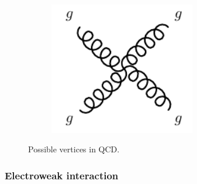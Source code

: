 \begin{figure}
\begin{subfigure}[b]{0.33\linewidth}
		\centering\includegraphics[width=0.7\textwidth]{gluon_quartic_vertex}
		\caption{\label{fig:gluon_quartic_vertix}}
	\end{subfigure}
	\caption{Possible vertices in QCD.}
	\label{fig:qcd_vertices}
\end{figure}

\subsubsection{Electroweak interaction}
\label{sec:ewk_interaction}

